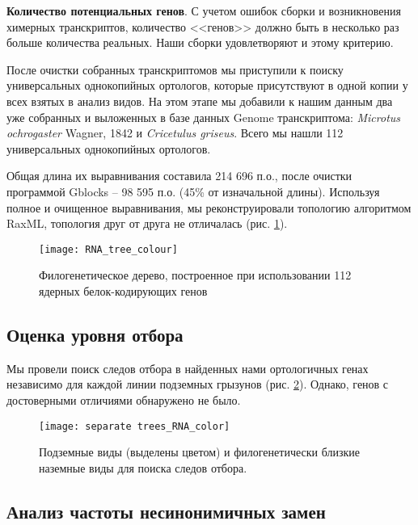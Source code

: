 \textbf{Количество потенциальных генов}. С учетом ошибок сборки и возникновения химерных транскриптов, количество <<генов>> должно быть в несколько раз больше количества реальных. Наши сборки удовлетворяют и этому критерию.  

После очистки собранных транскриптомов мы приступили к поиску универсальных однокопийных ортологов, которые присутствуют в одной копии у всех взятых в анализ видов. На этом этапе мы добавили к нашим данным два уже собранных и выложенных в базе данных Genome транскриптома: \textit{Microtus ochrogaster} Wagner, 1842 и \textit{Cricetulus griseus}. Всего мы нашли 112 универсальных однокопийных ортологов.

Общая длина их выравнивания составила 214 696 п.о., после очистки программой Gblocks -- 98 595 п.о. (45\% от изначальной длины). Используя полное и очищенное выравнивания, мы реконструировали топологию алгоритмом RaxML, топология друг от друга не отличалась (рис. \ref{tree_RNA}).

\begin{figure}[h!]
	\begin{center}
		\texttt{[image: RNA\_tree\_colour]}
	\end{center}
	\caption{Филогенетическое дерево, построенное при использовании 112 ядерных белок-кодирующих генов}\label{tree_RNA}
\end{figure}

\subsection{Оценка уровня отбора} 


Мы провели поиск следов отбора в найденных нами ортологичных генах независимо для каждой линии подземных грызунов (рис. \ref{RNA_trees_sep}). Однако, генов с достоверными отличиями обнаружено не было. 

\begin{figure}[h!]
	\begin{center}
		\texttt{[image: separate trees\_RNA\_color]}
	\end{center}
	\caption{Подземные виды (выделены цветом) и филогенетически близкие наземные виды для поиска следов отбора. }\label{RNA_trees_sep}
\end{figure}


\subsection{Анализ частоты несинонимичных замен}

